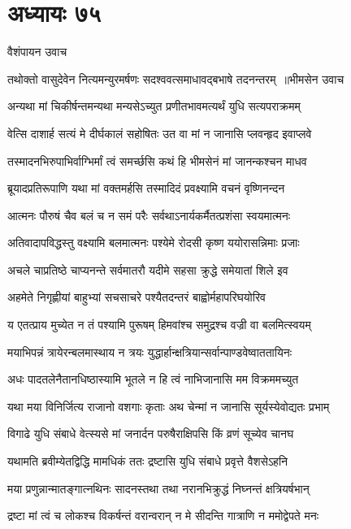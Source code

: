 \chapter{अध्यायः ७५}
\twolineshloka
{वैशंपायन उवाच}
{}


\threelineshloka
{तथोक्तो वासुदेवेन नित्यमन्युरमर्षणः}
{सदश्ववत्समाधावद्बभाषे तदनन्तरम् ॥भीमसेन उवाच}
{}


\twolineshloka
{अन्यथा मां चिकीर्षन्तमन्यथा मन्यसेऽच्युत}
{प्रणीतभावमत्यर्थं युधि सत्यपराक्रमम्}


\twolineshloka
{वेत्सि दाशार्ह सत्यं मे दीर्घकालं सहोषितः}
{उत वा मां न जानासि प्लवन्हृद इवाप्लवे}


\twolineshloka
{तस्मादनभिरुपाभिर्वाग्भिर्मां त्वं समर्च्छसि}
{कथं हि भीमसेनं मां जानन्कश्चन माधव}


\twolineshloka
{ब्रूयादप्रतिरूपाणि यथा मां वक्तमर्हसि}
{तस्मादिदं प्रवक्ष्यामि वचनं वृष्णिनन्दन}


\twolineshloka
{आत्मनः पौरुषं चैव बलं च न समं परैः}
{सर्वथाऽनार्यकर्मैतत्प्रशंसा स्वयमात्मनः}


\twolineshloka
{अतिवादापविद्धस्तु वक्ष्यामि बलमात्मनः}
{पश्येमे रोदसी कृष्ण ययोरासन्निमाः प्रजाः}


\twolineshloka
{अचले चाप्रतिष्ठे चाप्यनन्ते सर्वमातरौ}
{यदीमे सहसा क्रुद्धे समेयातां शिले इव}


\twolineshloka
{अहमेते निगृह्णीयां बाहुभ्यां सचसाचरे}
{पश्यैतदन्तरं बाह्वोर्महापरिघयोरिव}


\twolineshloka
{य एतत्प्राय मुच्येत न तं पश्यामि पुरूषम्}
{हिमवांश्च समुद्रश्च वज्री वा बलमित्स्वयम्}


\twolineshloka
{मयाभिपन्नं त्रायेरन्बलमास्थाय न त्रयः}
{युद्धार्हान्क्षत्रियान्सर्वान्पाण्डवेष्वाततायिनः}


\twolineshloka
{अधः पादतलेनैतानधिष्ठास्यामि भूतले}
{न हि त्वं नाभिजानासि मम विक्रममच्युत}


\twolineshloka
{यथा मया विनिर्जित्य राजानो वशगाः कृताः}
{अथ चेन्मां न जानासि सूर्यस्येवोद्यतः प्रभाम्}


\twolineshloka
{विगाढे युधि संबाधे वेत्स्यसे मां जनार्दन}
{परुषैराक्षिपसि किं व्रणं सूच्येव चानघ}


\twolineshloka
{यथामति ब्रवीम्येतद्विद्धि मामधिकं ततः}
{द्रष्टासि युधि संबाधे प्रवृत्ते वैशसेऽहनि}


\twolineshloka
{मया प्रणुन्नान्मातङ्गात्नथिनः सादनस्तथा}
{तथा नरानभिक्रुद्धं निघ्नन्तं क्षत्रियर्षभान्}


\twolineshloka
{द्रष्टा मां त्वं च लोकश्च विकर्षन्तं वरान्वरान्}
{न मे सीदन्ति गात्राणि न ममोद्वेपते मनः}


